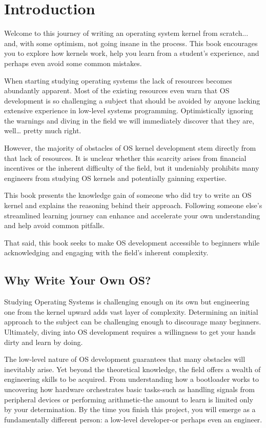 \chapter{Introduction}

Welcome to this journey of writing an operating system kernel from scratch... and, with some optimism, not going insane in the 
process. This book encourages you to explore how kernels work, help you learn from a student's experience, and 
perhaps even avoid some common mistakes. 

When starting studying operating systems the lack of resources becomes abundantly apparent. Most of the existing resources even
warn that OS development is so challenging a subject that should be avoided by anyone lacking extensive experience
in low-level systems programming. Optimistically ignoring the warnings and diving in the field we will immediately discover 
that they are, well… pretty much right.

However, the majority of obstacles of OS kernel development stem directly from that lack of resources.
It is unclear whether this scarcity arises from financial incentives or the inherent difficulty of the field, 
but it undeniably prohibits many engineers from studying OS kernels and potentially gainning expertise.

This book presents the knowledge gain of someone who did try to write an OS kernel and explains the reasoning behind their 
approach. Following someone else's streamlined learning journey can enhance and accelerate your own understanding 
and help avoid common pitfalls.

That said, this book seeks to make OS development accessible to beginners while acknowledging and engaging with the 
field's inherent complexity.

\section{Why Write Your Own OS?}

Studying Operating Systems is challenging enough on its own but engineering one from the kernel upward adds vast layer of
complexity. Determining an initial approach to the subject can be challenging enough to discourage many beginners. 
Ultimately, diving into OS development requires a willingness to get your hands dirty and learn by doing.

The low-level nature of OS development guarantees that many obstacles will inevitably arise. 
Yet beyond the theoretical knowledge, the field offers a wealth of engineering skills to be acquired. 
From understanding how a bootloader works to uncovering how hardware orchestrates basic tasks-such as handling 
signals from peripheral devices or performing arithmetic-the amount to learn is limited only by your determination. 
By the time you finish this project, you will emerge as a fundamentally different person: a low-level developer-or 
perhaps even an engineer.

